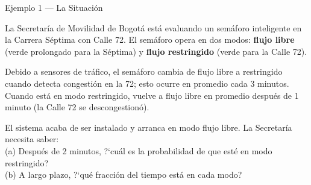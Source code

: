 \documentclass[aspectratio=1610, 9pt]{beamer}
\begin{document}
\begin{frame}{Ejemplo 1 --- La Situaci\'on}
\begin{situacionbox}
La Secretar\'ia de Movilidad de Bogot\'a est\'a evaluando un sem\'aforo inteligente en la Carrera S\'eptima con Calle 72. El sem\'aforo opera en dos modos: \textbf{flujo libre} (verde prolongado para la S\'eptima) y \textbf{flujo restringido} (verde para la Calle 72). 

Debido a sensores de tr\'afico, el sem\'aforo cambia de flujo libre a restringido cuando detecta congesti\'on en la 72; esto ocurre en promedio cada 3 minutos. Cuando est\'a en modo restringido, vuelve a flujo libre en promedio despu\'es de 1 minuto (la Calle 72 se descongestion\'o).

El sistema acaba de ser instalado y arranca en modo flujo libre. La Secretar\'ia necesita saber: \\[3pt]
(a) Despu\'es de 2 minutos, ?`cu\'al es la probabilidad de que est\'e en modo restringido?\\
(b) A largo plazo, ?`qu\'e fracci\'on del tiempo est\'a en cada modo?
\end{situacionbox}
\end{frame}
\end{document}
